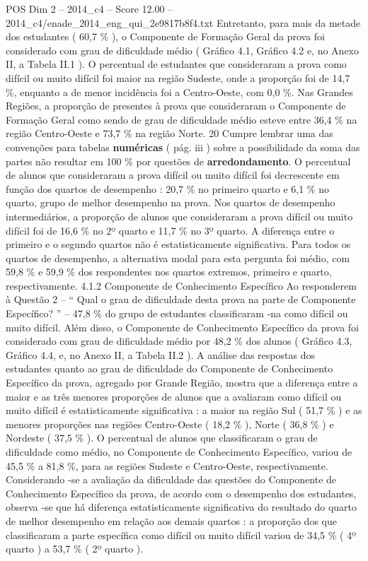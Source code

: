 \begin{textsample}{POS Dim 2 – 2014\_c4 – Score 12.00 – 2014\_c4/enade\_2014\_eng\_qui\_2e9817b8f4.txt}
Entretanto, para mais da metade dos estudantes ( 60,7 \% ), o Componente de Formação Geral da prova foi considerado com grau de dificuldade médio ( Gráfico 4.1, Gráfico 4.2 e, no Anexo II, a Tabela II.1 ).
O percentual de estudantes que consideraram a prova como difícil ou muito difícil foi maior na região Sudeste, onde a proporção foi de 14,7 \%, enquanto a de menor incidência foi a Centro-Oeste, com 0,0 \%.
Nas Grandes Regiões, a proporção de presentes à prova que consideraram o Componente de Formação Geral como sendo de grau de dificuldade médio esteve entre 36,4 \% na região Centro-Oeste e 73,7 \% na região Norte. 20 Cumpre lembrar uma das convenções para tabelas \textbf{numéricas} ( pág. iii ) sobre a possibilidade da soma das partes não resultar em 100 \% por questões de \textbf{arredondamento}.
O percentual de alunos que consideraram a prova difícil ou muito difícil foi decrescente em função dos quartos de desempenho : 20,7 \% no primeiro quarto e 6,1 \% no quarto, grupo de melhor desempenho na prova.
Nos quartos de desempenho intermediários, a proporção de alunos que consideraram a prova difícil ou muito difícil foi de 16,6 \% no 2º quarto e 11,7 \% no 3º quarto.
A diferença entre o primeiro e o segundo quartos não é estatisticamente significativa.
Para todos os quartos de desempenho, a alternativa modal para esta pergunta foi médio, com 59,8 \% e 59,9 \% dos respondentes nos quartos extremos, primeiro e quarto, respectivamente. 4.1.2 Componente de Conhecimento Específico Ao responderem à Questão 2 – “ Qual o grau de dificuldade desta prova na parte de Componente Específico? ” – 47,8 \% do grupo de estudantes classificaram -na como difícil ou muito difícil.
Além disso, o Componente de Conhecimento Específico da prova foi considerado com grau de dificuldade médio por 48,2 \% dos alunos ( Gráfico 4.3, Gráfico 4.4, e, no Anexo II, a Tabela II.2 ).
A análise das respostas dos estudantes quanto ao grau de dificuldade do Componente de Conhecimento Específico da prova, agregado por Grande Região, mostra que a diferença entre a maior e as três menores proporções de alunos que a avaliaram como difícil ou muito difícil é estatisticamente significativa : a maior na região Sul ( 51,7 \% ) e as menores proporções nas regiões Centro-Oeste ( 18,2 \% ), Norte ( 36,8 \% ) e Nordeste ( 37,5 \% ).
O percentual de alunos que classificaram o grau de dificuldade como médio, no Componente de Conhecimento Específico, variou de 45,5 \% a 81,8 \%, para as regiões Sudeste e Centro-Oeste, respectivamente.
Considerando -se a avaliação da dificuldade das questões do Componente de Conhecimento Específico da prova, de acordo com o desempenho dos estudantes, observa -se que há diferença estatisticamente significativa do resultado do quarto de melhor desempenho em relação aos demais quartos : a proporção dos que classificaram a parte específica como difícil ou muito difícil variou de 34,5 \% ( 4º quarto ) a 53,7 \% ( 2º quarto ).

\end{textsample}

